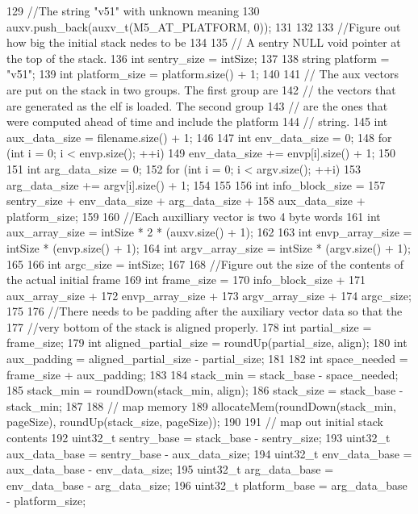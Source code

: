 \begin{DoxyCode}
{{129         //The string "v51" with unknown meaning
130         auxv.push_back(auxv_t(M5_AT_PLATFORM, 0));
131     }
132 
133     //Figure out how big the initial stack nedes to be
134 
135     // A sentry NULL void pointer at the top of the stack.
136     int sentry_size = intSize;
137 
138     string platform = "v51";
139     int platform_size = platform.size() + 1;
140 
141     // The aux vectors are put on the stack in two groups. The first group are
142     // the vectors that are generated as the elf is loaded. The second group
143     // are the ones that were computed ahead of time and include the platform
144     // string.
145     int aux_data_size = filename.size() + 1;
146 
147     int env_data_size = 0;
148     for (int i = 0; i < envp.size(); ++i) {
149         env_data_size += envp[i].size() + 1;
150     }
151     int arg_data_size = 0;
152     for (int i = 0; i < argv.size(); ++i) {
153         arg_data_size += argv[i].size() + 1;
154     }
155 
156     int info_block_size =
157         sentry_size + env_data_size + arg_data_size +
158         aux_data_size + platform_size;
159 
160     //Each auxilliary vector is two 4 byte words
161     int aux_array_size = intSize * 2 * (auxv.size() + 1);
162 
163     int envp_array_size = intSize * (envp.size() + 1);
164     int argv_array_size = intSize * (argv.size() + 1);
165 
166     int argc_size = intSize;
167 
168     //Figure out the size of the contents of the actual initial frame
169     int frame_size =
170         info_block_size +
171         aux_array_size +
172         envp_array_size +
173         argv_array_size +
174         argc_size;
175 
176     //There needs to be padding after the auxiliary vector data so that the
177     //very bottom of the stack is aligned properly.
178     int partial_size = frame_size;
179     int aligned_partial_size = roundUp(partial_size, align);
180     int aux_padding = aligned_partial_size - partial_size;
181 
182     int space_needed = frame_size + aux_padding;
183 
184     stack_min = stack_base - space_needed;
185     stack_min = roundDown(stack_min, align);
186     stack_size = stack_base - stack_min;
187 
188     // map memory
189     allocateMem(roundDown(stack_min, pageSize), roundUp(stack_size, pageSize));
190 
191     // map out initial stack contents
192     uint32_t sentry_base = stack_base - sentry_size;
193     uint32_t aux_data_base = sentry_base - aux_data_size;
194     uint32_t env_data_base = aux_data_base - env_data_size;
195     uint32_t arg_data_base = env_data_base - arg_data_size;
196     uint32_t platform_base = arg_data_base - platform_size;
}
\end{DoxyCode}
